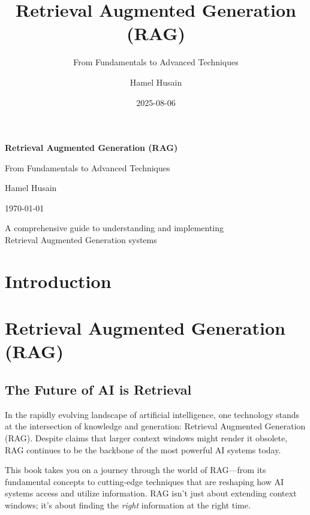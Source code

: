\documentclass[
  letterpaper,
  oneside]{scrbook}
\title{Retrieval Augmented Generation (RAG)}
\subtitle{From Fundamentals to Advanced Techniques}
\author{Hamel Husain}
\date{2025-08-06}
\renewcommand*\contentsname{Table of contents}
\newcommand\contentsname{Table of contents}
\begin{document}
\frontmatter
\maketitle

\begin{titlepage}
\centering
\vspace*{3cm}
{\Huge\bfseries Retrieval Augmented Generation (RAG)\par}
\vspace{1cm}
{\Large From Fundamentals to Advanced Techniques\par}
\vspace{2cm}
{\Large Hamel Husain\par}
\vspace{1cm}
{\large \today\par}
\vspace{2cm}
{\large A comprehensive guide to understanding and implementing\\ Retrieval Augmented Generation systems\par}
\end{titlepage}

\renewcommand*\contentsname{Table of contents}
{
\hypersetup{linkcolor=}
\setcounter{tocdepth}{2}
\tableofcontents
}
\mainmatter
{}

\chapter{Introduction}\label{introduction}


\chapter{Retrieval Augmented Generation
(RAG)}\label{retrieval-augmented-generation-rag}

\section{The Future of AI is
Retrieval}\label{the-future-of-ai-is-retrieval}

In the rapidly evolving landscape of artificial intelligence, one
technology stands at the intersection of knowledge and generation:
Retrieval Augmented Generation (RAG). Despite claims that larger context
windows might render it obsolete, RAG continues to be the backbone of
the most powerful AI systems today.

This book takes you on a journey through the world of RAG---from its
fundamental concepts to cutting-edge techniques that are reshaping how
AI systems access and utilize information. RAG isn't just about
extending context windows; it's about finding the \emph{right}
information at the right time.
\end{document}

